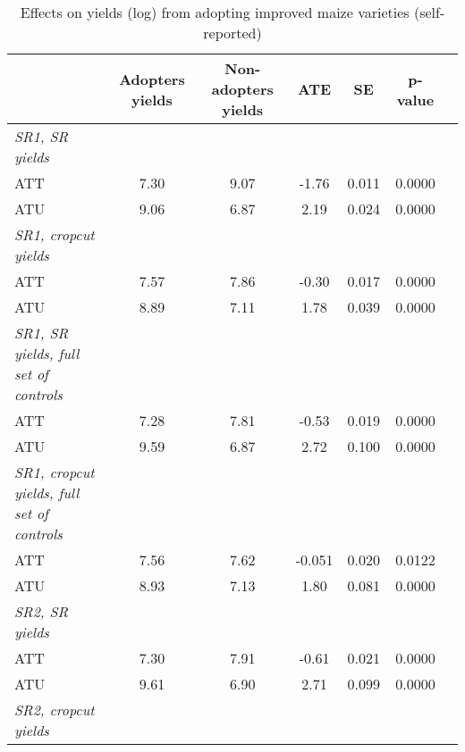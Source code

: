 \begin{table}[H]
\centering
\hspace*{-1.2cm}
\begin{threeparttable}
\caption{Effects on yields (log) from adopting improved maize varieties (self-reported)}
\label{tab:switch1}
\begin{tabular}{l cccccc}
\hline
\hline
            &Adopters yields&Non-adopters yields&         ATE&          SE&     p-value\\
\hline
\textit{SR1, SR yields}&            &            &            &            &            \\
ATT         &        7.30&        9.07&       -1.76&       0.011&      0.0000\\
%
%
%
ATU         &        9.06&        6.87&        2.19&       0.024&      0.0000\\
%
%
%
\textit{SR1, cropcut yields}&            &            &            &            &            \\
ATT         &        7.57&        7.86&       -0.30&       0.017&      0.0000\\
%
%
%
ATU         &        8.89&        7.11&        1.78&       0.039&      0.0000\\
%
%
%
\textit{SR1, SR yields, full set of controls}&            &            &            &            &            \\
ATT         &        7.28&        7.81&       -0.53&       0.019&      0.0000\\
%
%
%
ATU         &        9.59&        6.87&        2.72&       0.100&      0.0000\\
%
%
%
\textit{SR1, cropcut yields, full set of controls}&            &            &            &            &            \\
ATT         &        7.56&        7.62&      -0.051&       0.020&      0.0122\\
%
%
%
ATU         &        8.93&        7.13&        1.80&       0.081&      0.0000\\
%
%
%
\textit{SR2, SR yields}&            &            &            &            &            \\
ATT         &        7.30&        7.91&       -0.61&       0.021&      0.0000\\
%
%
%
ATU         &        9.61&        6.90&        2.71&       0.099&      0.0000\\
%
%
%
\textit{SR2, cropcut yields}&            &            &            &            &            \\

\end{tabular}
\end{threeparttable}
\end{table}
